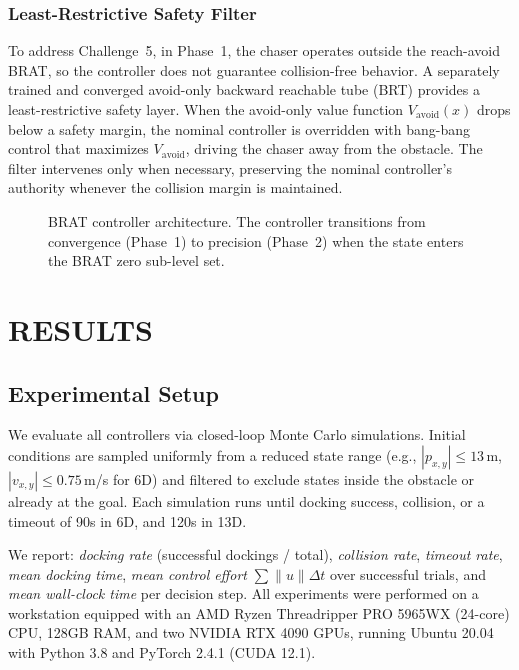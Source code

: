 \documentclass[letterpaper, 10 pt, conference]{ieeeconf}
\begin{document}
\subsubsection{Least-Restrictive Safety Filter} To address Challenge~5, in Phase~1, the chaser operates outside the reach-avoid BRAT, so the controller does not guarantee collision-free behavior. A separately trained and converged avoid-only backward reachable tube (BRT) provides a least-restrictive safety layer. When the avoid-only value function $V_{\mathrm{avoid}}(x)$ drops below a safety margin, the nominal controller is overridden with bang-bang control that maximizes $V_{\mathrm{avoid}}$, driving the chaser away from the obstacle. The filter intervenes only when necessary, preserving the nominal controller's authority whenever the collision margin is maintained.

   \begin{figure}[t]
      \centering
      \caption{BRAT controller architecture. The controller transitions from convergence (Phase~1) to precision (Phase~2) when the state enters the BRAT zero sub-level set.}
      \label{fig:controller}
   \end{figure}

\section{RESULTS}

\subsection{Experimental Setup}

We evaluate all controllers via closed-loop Monte Carlo simulations. Initial conditions are sampled uniformly from a reduced state range (e.g., $|p_{x,y}| \leq 13$\,m, $|v_{x,y}| \leq 0.75$\,m/s for 6D) and filtered to exclude states inside the obstacle or already at the goal. Each simulation runs until docking success, collision, or a timeout of 90s in 6D, and 120s in 13D.

We report: \emph{docking rate} (successful dockings / total), \emph{collision rate}, \emph{timeout rate}, \emph{mean docking time}, \emph{mean control effort} $\sum \|u\| \Delta t$ over successful trials, and \emph{mean wall-clock time} per decision step. All experiments were performed on a workstation equipped with an AMD Ryzen Threadripper PRO 5965WX (24-core) CPU, 128GB RAM, and two NVIDIA RTX 4090 GPUs, running Ubuntu 20.04 with Python 3.8 and PyTorch 2.4.1 (CUDA 12.1).
\end{document}
